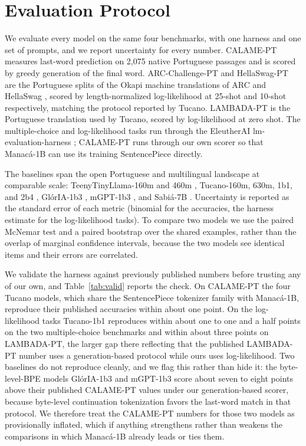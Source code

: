 \documentclass[11pt]{article}
\begin{document}
\section{Evaluation Protocol}

We evaluate every model on the same four benchmarks, with one harness and one set of
prompts, and we report uncertainty for every number. CALAME-PT \cite{gloria} measures
last-word prediction on 2{,}075 native Portuguese passages and is scored by greedy
generation of the final word. ARC-Challenge-PT and HellaSwag-PT are the Portuguese
splits of the Okapi \cite{okapi} machine translations of ARC \cite{arc} and HellaSwag
\cite{hellaswag}, scored by length-normalized log-likelihood at 25-shot and 10-shot
respectively, matching the protocol reported by Tucano. LAMBADA-PT \cite{lambada} is
the Portuguese translation used by Tucano, scored by log-likelihood at zero shot. The
multiple-choice and log-likelihood tasks run through the EleutherAI
lm-evaluation-harness \cite{lmeval}; CALAME-PT runs through our own scorer so that
Manac\'a-1B can use its training SentencePiece directly.

The baselines span the open Portuguese and multilingual landscape at comparable
scale: TeenyTinyLlama-160m and 460m \cite{ttl}, Tucano-160m, 630m, 1b1, and 2b4
\cite{tucano}, Gl\'orIA-1b3 \cite{gloria}, mGPT-1b3 \cite{mgpt}, and Sabi\'a-7B
\cite{sabia}. Uncertainty is reported as the standard error of each metric (binomial
for the accuracies, the harness estimate for the log-likelihood tasks). To compare
two models we use the paired McNemar test and a paired bootstrap over the shared
examples, rather than the overlap of marginal confidence intervals, because the two
models see identical items and their errors are correlated.

We validate the harness against previously published numbers before trusting any of our
own, and Table~\ref{tab:valid} reports the check. On CALAME-PT the four Tucano models,
which share the SentencePiece tokenizer family with Manac\'a-1B, reproduce their
published accuracies within about one point. On the log-likelihood tasks Tucano-1b1
reproduces within about one to one and a half points on the two multiple-choice
benchmarks and within about three points on LAMBADA-PT, the larger gap there reflecting
that the published LAMBADA-PT number uses a generation-based protocol while ours uses
log-likelihood. Two baselines do not reproduce cleanly, and we flag this rather than
hide it: the byte-level-BPE models Gl\'orIA-1b3 and mGPT-1b3 score about seven to eight
points above their published CALAME-PT values under our generation-based scorer, because
byte-level continuation tokenization favors the last-word match in that protocol. We
therefore treat the CALAME-PT numbers for those two models as provisionally inflated,
which if anything strengthens rather than weakens the comparisons in which Manac\'a-1B
already leads or ties them.
\end{document}
